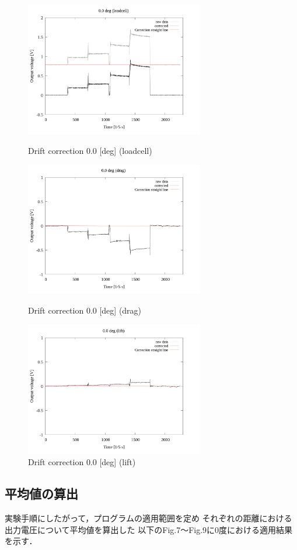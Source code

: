 \documentclass[twocolumn,a4j]{jsarticle}
\begin{document}
\begin{figure}[htbp]
    \footnotesize
    \begin{center}
        \includegraphics[width=78mm]{../images_2/02-1_loadcell/02_loadcell-drift_0.png}
        \caption{Drift correction 0.0 [deg] (loadcell)}
        \includegraphics[width=78mm]{../images_2/02-2_drag/02_drag-drift_0.png}
        \caption{Drift correction 0.0 [deg] (drag)}
        \includegraphics[width=78mm]{../images_2/02-3_lift/02_lift-drift_0.png}
        \caption{Drift correction 0.0 [deg] (lift)}
    \end{center}
\end{figure}

\newpage

\subsection{平均値の算出}
実験手順にしたがって，プログラムの適用範囲を定め
それぞれの距離における出力電圧について平均値を算出した
以下のFig.7～Fig.9に0度における適用結果を示す．
\end{document}
